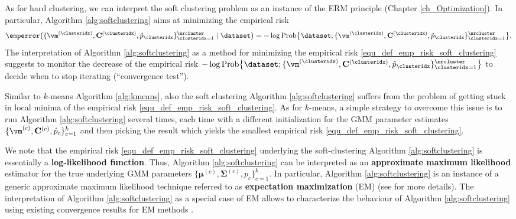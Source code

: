 \documentclass[12pt]{report}
\begin{document}
As for hard clustering, we can interpret the soft clustering problem as an instance 
of the ERM principle (Chapter \ref{ch_Optimization}). In particular, Algorithm \ref{alg:softclustering} 
aims at minimizing the empirical risk 
\begin{equation} 
\label{equ_def_emp_risk_soft_clustering}
\emperror \big( \{ \vm^{(\clusteridx)}, \mathbf{C}^{(\clusteridx)}, \hat{p}_{\clusteridx} \}_{\clusteridx=1}^{\nrcluster} \mid \dataset \big)=
 - \log {\rm Prob} \big\{\dataset; \{ \vm^{(\clusteridx)}, \mathbf{C}^{(\clusteridx)}, \hat{p}_{\clusteridx} \}_{\clusteridx=1}^{\nrcluster}\big\}. 
\end{equation} 
The interpretation of Algorithm \ref{alg:softclustering} as a method for minimizing the empirical 
risk \eqref{equ_def_emp_risk_soft_clustering} suggests to monitor the decrease of the empirical 
risk $ - \log {\rm Prob} \big\{\dataset; \{ \vm^{(\clusteridx)}, \mathbf{C}^{(\clusteridx)}, \hat{p}_{\clusteridx} \}_{\clusteridx=1}^{\nrcluster}\big\}$ 
to decide when to stop iterating (``convergence test''). %

Similar to $k$-means Algorithm \ref{alg:kmeans}, also the soft clustering Algorithm \ref{alg:softclustering} 
suffers from the problem of getting stuck in local minima of the empirical risk \eqref{equ_def_emp_risk_soft_clustering}. 
As for $k$-means, a simple strategy to overcome this issue is to run Algorithm \ref{alg:softclustering} 
several times, each time with a different initialization for the GMM parameter estimates 
$ \{ \vm^{(c)}, \mathbf{C}^{(c)}, \hat{p}_{c} \}_{c=1}^{k}$ and then picking the result which yields the 
smallest empirical risk \eqref{equ_def_emp_risk_soft_clustering}.  

We note that the empirical risk \eqref{equ_def_emp_risk_soft_clustering} underlying the 
soft-clustering Algorithm \ref{alg:softclustering} is essentially a {\bf log-likelihood function}. 
Thus, Algorithm \ref{alg:softclustering} can be interpreted as an {\bf approximate maximum 
likelihood} estimator for the true underlying GMM parameters $\{{\bm \mu}^{(c)},{\bm \Sigma}^{(c)},p_{c}\}_{c=1}^{k}$. 
In particular, Algorithm \ref{alg:softclustering} is an instance of a generic approximate maximum likelihood 
technique referred to as {\bf expectation maximization} (EM) (see \cite[Chap. 8.5]{hastie01statisticallearning} for more details). 
The interpretation of Algorithm \ref{alg:softclustering} as a special case of EM allows to characterize the 
behaviour of Algorithm \ref{alg:softclustering} using existing convergence results for EM methods \cite{XuJordan1996}. 
%
\end{document}
